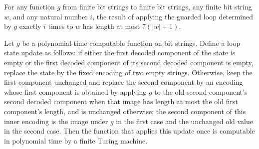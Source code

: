 \begin{theorem}
\label{Complexity.BinArith.length_iterate_guardLoop_le}
\leanok
{}
For any function $g$ from finite bit strings to finite bit strings, any finite bit
string $w$, and any natural number $i$, the result of applying the guarded loop
determined by $g$ exactly $i$ times to $w$ has length at most $7(|w|+1)$.
\end{theorem}

\begin{theorem}
\label{Complexity.BinArith.polyTimeComputable_guardLoop}
\leanok
{}
Let $g$ be a polynomial-time computable function on bit strings. Define a loop state
update as follows: if either the first decoded component of the state is empty or the
first decoded component of its second decoded component is empty, replace the state by
the fixed encoding of two empty strings. Otherwise, keep the first component unchanged
and replace the second component by an encoding whose first component is obtained by
applying $g$ to the old second component's second decoded component when that image has
length at most the old first component's length, and is unchanged otherwise; the second
component of this inner encoding is the image under $g$ in the first case and the
unchanged old value in the second case. Then the function that applies this update once
is computable in polynomial time by a finite Turing machine.
\end{theorem}

